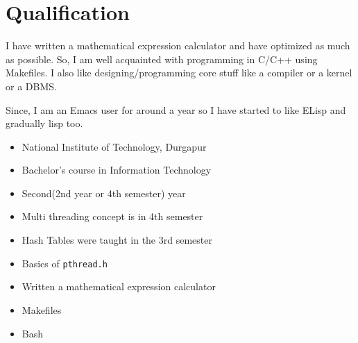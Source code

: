 \documentclass[11pt]{article}
\begin{document}
\section{Qualification}
\label{sec:orgfd02e25}
I have written a mathematical expression calculator and have optimized as much
as possible. So, I am well acquainted with programming in C/C++ using Makefiles.
I also like designing/programming core stuff like a compiler or a kernel or a
DBMS.

Since, I am an Emacs user for around a year so I have started to like ELisp and
gradually lisp too.

\begin{itemize}
\item National Institute of Technology, Durgapur
\item Bachelor's course in Information Technology
\item Second(2nd year or 4th semester) year
\item Multi threading concept is in 4th semester
\item Hash Tables were taught in the 3rd semester
\item Basics of \texttt{pthread.h}
\item Written a mathematical expression calculator
\item Makefiles
\item Bash
\end{itemize}
\end{document}
